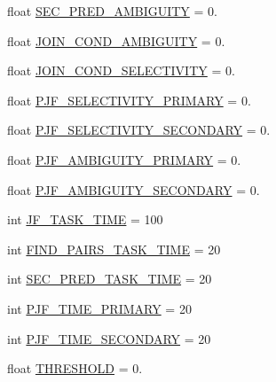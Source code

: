 \begin{DoxyCompactItemize}
\item 
float \mbox{\hyperlink{namespacejoinapp_1_1toggles_a82672765987aa6303bc82f0ef4bceaec}{S\+E\+C\+\_\+\+P\+R\+E\+D\+\_\+\+A\+M\+B\+I\+G\+U\+I\+TY}} = 0.
\item 
float \mbox{\hyperlink{namespacejoinapp_1_1toggles_a944adb62fd03b59c404c102132ab4ad5}{J\+O\+I\+N\+\_\+\+C\+O\+N\+D\+\_\+\+A\+M\+B\+I\+G\+U\+I\+TY}} = 0.
\item 
float \mbox{\hyperlink{namespacejoinapp_1_1toggles_aa46531a0659f795fefc42d717192338a}{J\+O\+I\+N\+\_\+\+C\+O\+N\+D\+\_\+\+S\+E\+L\+E\+C\+T\+I\+V\+I\+TY}} = 0.
\item 
float \mbox{\hyperlink{namespacejoinapp_1_1toggles_a8b00936c4a2e7d7d11e852bab9cfd054}{P\+J\+F\+\_\+\+S\+E\+L\+E\+C\+T\+I\+V\+I\+T\+Y\+\_\+\+P\+R\+I\+M\+A\+RY}} = 0.
\item 
float \mbox{\hyperlink{namespacejoinapp_1_1toggles_a2d272cfa26403db887287c068f9b052d}{P\+J\+F\+\_\+\+S\+E\+L\+E\+C\+T\+I\+V\+I\+T\+Y\+\_\+\+S\+E\+C\+O\+N\+D\+A\+RY}} = 0.
\item 
float \mbox{\hyperlink{namespacejoinapp_1_1toggles_af5b94058f173dfb2d574ecdf88225ab7}{P\+J\+F\+\_\+\+A\+M\+B\+I\+G\+U\+I\+T\+Y\+\_\+\+P\+R\+I\+M\+A\+RY}} = 0.
\item 
float \mbox{\hyperlink{namespacejoinapp_1_1toggles_a6ec68a94a8c7ebd61183ac9bdb9256d6}{P\+J\+F\+\_\+\+A\+M\+B\+I\+G\+U\+I\+T\+Y\+\_\+\+S\+E\+C\+O\+N\+D\+A\+RY}} = 0.
\item 
int \mbox{\hyperlink{namespacejoinapp_1_1toggles_a2890f9e2f637c2293ea00e3c4871df0a}{J\+F\+\_\+\+T\+A\+S\+K\+\_\+\+T\+I\+ME}} = 100
\item 
int \mbox{\hyperlink{namespacejoinapp_1_1toggles_ab907635a100ad36178810fdd47dac68b}{F\+I\+N\+D\+\_\+\+P\+A\+I\+R\+S\+\_\+\+T\+A\+S\+K\+\_\+\+T\+I\+ME}} = 20
\item 
int \mbox{\hyperlink{namespacejoinapp_1_1toggles_a6742746073934d93b6ca34238b2e4ade}{S\+E\+C\+\_\+\+P\+R\+E\+D\+\_\+\+T\+A\+S\+K\+\_\+\+T\+I\+ME}} = 20
\item 
int \mbox{\hyperlink{namespacejoinapp_1_1toggles_a0fc83e78cf9103b9dd844ea03477b023}{P\+J\+F\+\_\+\+T\+I\+M\+E\+\_\+\+P\+R\+I\+M\+A\+RY}} = 20
\item 
int \mbox{\hyperlink{namespacejoinapp_1_1toggles_a6ab3d8e4acaac59c9e1a4af6980ee652}{P\+J\+F\+\_\+\+T\+I\+M\+E\+\_\+\+S\+E\+C\+O\+N\+D\+A\+RY}} = 20
\item 
float \mbox{\hyperlink{namespacejoinapp_1_1toggles_aa4a5babd6a47f588b10406827346b66f}{T\+H\+R\+E\+S\+H\+O\+LD}} = 0.
\end{DoxyCompactItemize}



